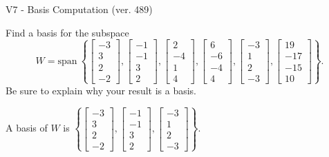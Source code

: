 \begin{exercise}
  \begin{exerciseTitle}V7 - Basis Computation (ver. 489)\end{exerciseTitle}
  \begin{exerciseStatement}
    Find a basis for the subspace 
\[W=\mathrm{span}\ \left\{\left[\begin{array}{r}
-3 \\
3 \\
2 \\
-2
\end{array}\right] , \left[\begin{array}{r}
-1 \\
-1 \\
3 \\
2
\end{array}\right] , \left[\begin{array}{r}
2 \\
-4 \\
1 \\
4
\end{array}\right] , \left[\begin{array}{r}
6 \\
-6 \\
-4 \\
4
\end{array}\right] , \left[\begin{array}{r}
-3 \\
1 \\
2 \\
-3
\end{array}\right] , \left[\begin{array}{r}
19 \\
-17 \\
-15 \\
10
\end{array}\right]\right\}.\]
 Be sure to explain why your result is a basis.


  \end{exerciseStatement}
  \begin{exerciseAnswer}
   A basis of \(W\) is  \(\left\{\left[\begin{array}{r}
-3 \\
3 \\
2 \\
-2
\end{array}\right] , \left[\begin{array}{r}
-1 \\
-1 \\
3 \\
2
\end{array}\right] , \left[\begin{array}{r}
-3 \\
1 \\
2 \\
-3
\end{array}\right]\right\}\).
  


  \end{exerciseAnswer}
\end{exercise}